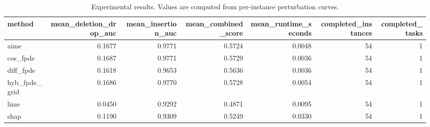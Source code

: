 \begin{table}[t]
\caption{Experimental results. Values are computed from per-instance perturbation curves.}
\label{tab:main_results_computed}
\centering
\begin{tabular}{lrrrrrr}
\toprule
method & mean\_deletion\_drop\_auc & mean\_insertion\_auc & mean\_combined\_score & mean\_runtime\_seconds & completed\_instances & completed\_tasks \\
\midrule
aime & 0.1677 & 0.9771 & 0.5724 & 0.0048 & 54 & 1 \\
cos\_fpde & 0.1687 & 0.9771 & 0.5729 & 0.0036 & 54 & 1 \\
diff\_fpde & 0.1618 & 0.9653 & 0.5636 & 0.0036 & 54 & 1 \\
hyb\_fpde\_grid & 0.1686 & 0.9770 & 0.5728 & 0.0054 & 54 & 1 \\
lime & 0.0450 & 0.9292 & 0.4871 & 0.0095 & 54 & 1 \\
shap & 0.1190 & 0.9309 & 0.5249 & 0.0330 & 54 & 1 \\
\bottomrule
\end{tabular}

\end{table}
